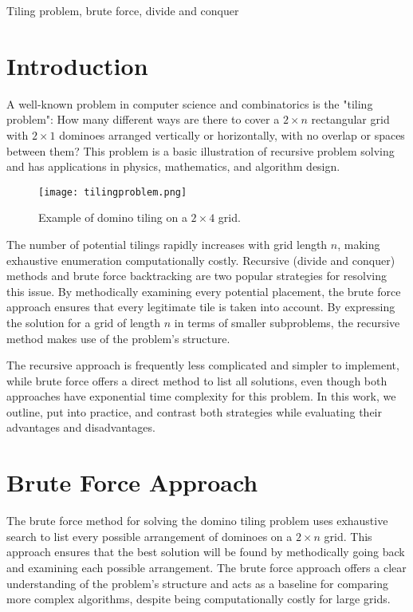 \documentclass[conference]{IEEEtran}
\begin{document}
\begin{IEEEkeywords}
Tiling problem, brute force, divide and conquer
\end{IEEEkeywords}

\section{Introduction}
A well-known problem in computer science and combinatorics is the "tiling problem": How many different ways are there to cover a $2 \times n$ rectangular grid with $2 \times 1$ dominoes arranged vertically or horizontally, with no overlap or spaces between them? This problem is a basic illustration of recursive problem solving and has applications in physics, mathematics, and algorithm design.

\begin{figure}[htbp]
\centerline{\texttt{[image: tilingproblem.png]}}
\caption{Example of domino tiling on a $2 \times 4$ grid.}
\label{fig:tiling_example}
\end{figure}

The number of potential tilings rapidly increases with grid length $n$, making exhaustive enumeration computationally costly. Recursive (divide and conquer) methods and brute force backtracking are two popular strategies for resolving this issue. By methodically examining every potential placement, the brute force approach ensures that every legitimate tile is taken into account. By expressing the solution for a grid of length $n$ in terms of smaller subproblems, the recursive method makes use of the problem's structure.

The recursive approach is frequently less complicated and simpler to implement, while brute force offers a direct method to list all solutions, even though both approaches have exponential time complexity for this problem. In this work, we outline, put into practice, and contrast both strategies while evaluating their advantages and disadvantages.

\section{Brute Force Approach}

The brute force method for solving the domino tiling problem uses exhaustive search to list every possible arrangement of dominoes on a $2 \times n$ grid. This approach ensures that the best solution will be found by methodically going back and examining each possible arrangement. The brute force approach offers a clear understanding of the problem's structure and acts as a baseline for comparing more complex algorithms, despite being computationally costly for large grids.
\end{document}
